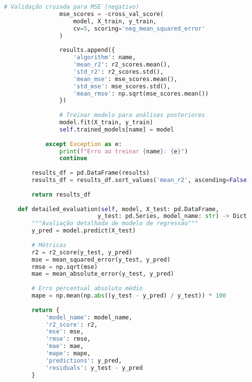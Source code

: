 \begin{pythonbox}
\begin{lstlisting}[language=Python]                  
                # Validação cruzada para MSE (negativo)
                mse_scores = -cross_val_score(
                    model, X_train, y_train, 
                    cv=5, scoring='neg_mean_squared_error'
                )
                
                results.append({
                    'algorithm': name,
                    'mean_r2': r2_scores.mean(),
                    'std_r2': r2_scores.std(),
                    'mean_mse': mse_scores.mean(),
                    'std_mse': mse_scores.std(),
                    'mean_rmse': np.sqrt(mse_scores.mean())
                })
                
                # Treinar modelo para análises posteriores
                model.fit(X_train, y_train)
                self.trained_models[name] = model
                
            except Exception as e:
                print(f"Erro ao treinar {name}: {e}")
                continue
        
        results_df = pd.DataFrame(results)
        results_df = results_df.sort_values('mean_r2', ascending=False)
        
        return results_df
    
    def detailed_evaluation(self, model, X_test: pd.DataFrame, 
                           y_test: pd.Series, model_name: str) -> Dict:
        """Avaliação detalhada de modelo de regressão"""
        y_pred = model.predict(X_test)
        
        # Métricas
        r2 = r2_score(y_test, y_pred)
        mse = mean_squared_error(y_test, y_pred)
        rmse = np.sqrt(mse)
        mae = mean_absolute_error(y_test, y_pred)
        
        # Erro percentual absoluto médio
        mape = np.mean(np.abs((y_test - y_pred) / y_test)) * 100
        
        return {
            'model_name': model_name,
            'r2_score': r2,
            'mse': mse,
            'rmse': rmse,
            'mae': mae,
            'mape': mape,
            'predictions': y_pred,
            'residuals': y_test - y_pred
        }
\end{lstlisting}
\end{pythonbox}

\newpage

